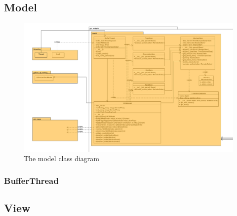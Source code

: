 \subsection{Model}

\begin{figure}[here]
\begin{center}
\includegraphics[width=1.0\linewidth]{./bilder/model.png}
\caption{The model class diagram}
\end{center}
\end{figure}

\subsubsection{BufferThread}

\subsection{View}

